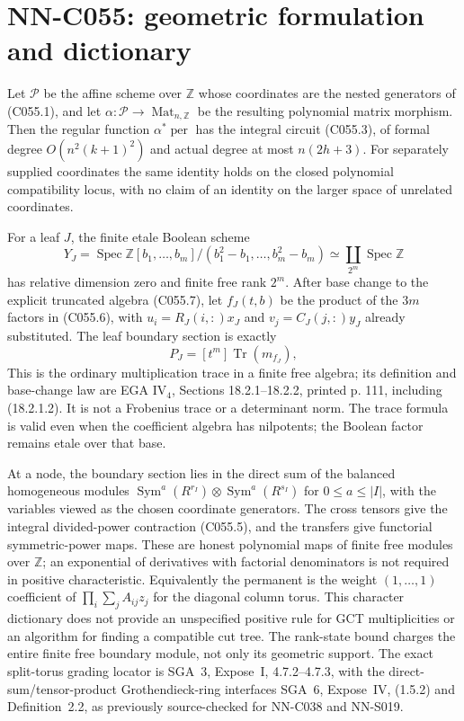 \section{NN-C055: geometric formulation and dictionary}
\begin{geometricstatement}[NN-C055]
Let $\mathcal P$ be the affine scheme over $\mathbb Z$ whose coordinates
are the nested generators of (C055.1), and let
$\alpha:\mathcal P\to\operatorname{Mat}_{n,\mathbb Z}$ be the
resulting polynomial matrix morphism.  Then the regular function
$\alpha^*\operatorname{per}$ has the integral circuit (C055.3),
of formal degree $O(n^2(k+1)^2)$ and actual degree at most
$n(2h+3)$.  For separately supplied coordinates the same identity
holds on the closed polynomial compatibility locus, with no
claim of an identity on the larger space of unrelated coordinates.

For a leaf $J$, the finite etale Boolean scheme
\[
 Y_J=\operatorname{Spec}
   \mathbb Z[b_1,\ldots,b_m]/(b_1^2-b_1,\ldots,b_m^2-b_m)
       \simeq\coprod_{2^m}\operatorname{Spec}\mathbb Z
\]
has relative dimension zero and finite free rank $2^m$.
After base change to the explicit truncated algebra (C055.7),
let $f_J(t,b)$ be the product of the $3m$ factors in (C055.6),
with $u_i=R_J(i,:)x_J$ and $v_j=C_J(j,:)y_J$ already substituted.
The leaf boundary section is exactly
\[
                   P_J=[t^m]\operatorname{Tr}(m_{f_J}),
\tag{C055.10}
\]
This is the ordinary multiplication trace in a finite free algebra; its
definition and base-change law are EGA IV$_4$, Sections
18.2.1--18.2.2, printed p. 111, including (18.2.1.2).
It is not a Frobenius trace or a determinant norm.
The trace formula is valid even when the coefficient algebra
has nilpotents; the Boolean factor remains etale over that base.

At a node, the boundary section lies in the direct sum of the
balanced homogeneous modules
$\operatorname{Sym}^a(R^{r_I})\otimes
 \operatorname{Sym}^a(R^{s_I})$ for $0\le a\le|I|$, with the
variables viewed as the chosen coordinate generators.
The cross tensors give the integral divided-power contraction
(C055.5), and the transfers give functorial symmetric-power maps.
These are honest polynomial maps of finite free modules over
$\mathbb Z$; an exponential of derivatives with factorial
denominators is not required in positive characteristic.
Equivalently the permanent is the weight $(1,\ldots,1)$ coefficient
of $\prod_i\sum_j A_{ij}z_j$ for the diagonal column torus.
This character dictionary does not provide an unspecified
positive rule for GCT multiplicities or an algorithm for finding
a compatible cut tree.  The rank-state bound charges the entire
finite free boundary module, not only its geometric support.
The exact split-torus grading locator is SGA~3, Expose~I,
4.7.2--4.7.3, with the direct-sum/tensor-product Grothendieck-ring
interfaces SGA~6, Expose~IV, (1.5.2) and Definition~2.2, as
previously source-checked for NN-C038 and NN-S019.


\end{geometricstatement}
